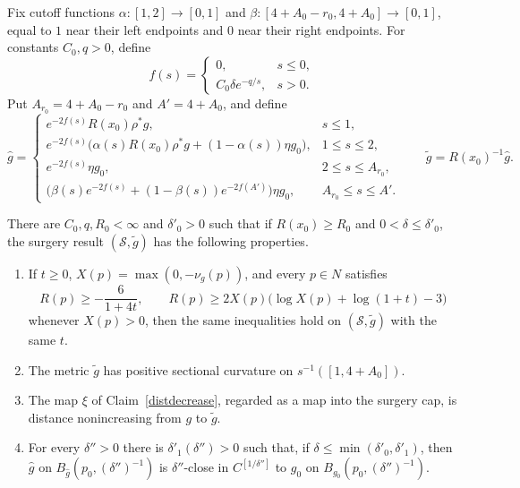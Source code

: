Fix cutoff functions $\alpha:[1,2]\to[0,1]$ and
$\beta:[4+A_0-r_0,4+A_0]\to[0,1]$, equal to $1$ near their left endpoints
and $0$ near their right endpoints. For constants $C_0,q>0$, define
\[
  f(s)=
  \begin{cases}
  0,&s\leq0,\\
  C_0\delta e^{-q/s},&s>0.
  \end{cases}
\]
Put $A_{r_0}=4+A_0-r_0$ and $A'=4+A_0$, and define
\[
\widehat g=
\begin{cases}
e^{-2f(s)}R(x_0)\rho^*g,&s\leq1,\\
e^{-2f(s)}\bigl(\alpha(s)R(x_0)\rho^*g+(1-\alpha(s))\eta g_0\bigr),
  &1\leq s\leq2,\\
e^{-2f(s)}\eta g_0,&2\leq s\leq A_{r_0},\\
\bigl(\beta(s)e^{-2f(s)}+(1-\beta(s))e^{-2f(A')}\bigr)\eta g_0,
  &A_{r_0}\leq s\leq A'.
\end{cases}
\qquad
\widetilde g=R(x_0)^{-1}\widehat g.
\]

\begin{theorem}
\label{thm:local-surgery}

\label{LOCALSURGERY}
There are $C_0,q,R_0<\infty$ and $\delta'_0>0$ such that if
$R(x_0)\geq R_0$ and $0<\delta\leq\delta'_0$, the surgery result
$({\mathcal S},\widetilde g)$ has the following properties.
\begin{enumerate}
\item If $t\geq0$, $X(p)=\max(0,-\nu_g(p))$, and every $p\in N$ satisfies
\[
  R(p)\geq-\frac6{1+4t},
  \qquad
  R(p)\geq2X(p)\bigl(\log X(p)+\log(1+t)-3\bigr)
\]
whenever $X(p)>0$, then the same inequalities hold on
$({\mathcal S},\widetilde g)$ with the same $t$.
\item The metric $\widetilde g$ has positive sectional curvature on
$s^{-1}([1,4+A_0])$.
\item The map $\xi$ of Claim~\ref{distdecrease}, regarded as a map into the
surgery cap, is distance nonincreasing from $g$ to $\widetilde g$.
\item For every $\delta''>0$ there is
$\delta'_1(\delta'')>0$ such that, if
$\delta\leq\min(\delta'_0,\delta'_1)$, then
$\widehat g$ on $B_{\widehat g}(p_0,(\delta'')^{-1})$ is
$\delta''$-close in $C^{[1/\delta'']}$ to $g_0$ on
$B_{g_0}(p_0,(\delta'')^{-1})$.
\end{enumerate}
\end{theorem}

